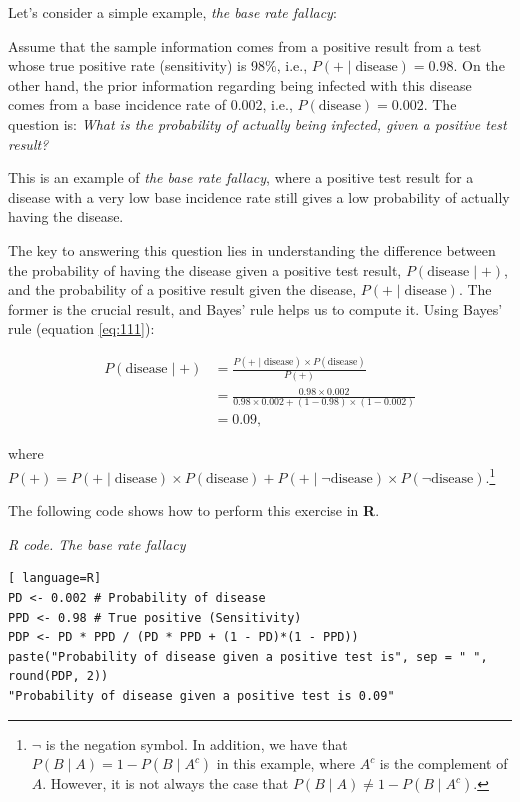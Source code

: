 Let's consider a simple example, \textit{the base rate fallacy}:

Assume that the sample information comes from a positive result from a test whose true positive rate (sensitivity) is 98\%, i.e., \( P(+ \mid \text{disease}) = 0.98 \). On the other hand, the prior information regarding being infected with this disease comes from a base incidence rate of 0.002, i.e., \( P(\text{disease}) = 0.002 \). The question is: \textit{What is the probability of actually being infected, given a positive test result?}

This is an example of \textit{the base rate fallacy}, where a positive test result for a disease with a very low base incidence rate still gives a low probability of actually having the disease.

The key to answering this question lies in understanding the difference between the probability of having the disease given a positive test result, \( P(\text{disease} \mid +) \), and the probability of a positive result given the disease, \( P(+ \mid \text{disease}) \). The former is the crucial result, and Bayes' rule helps us to compute it. Using Bayes' rule (equation \ref{eq:111}):

\begin{align*}
	P(\text{disease}\mid +) & = \frac{P(+\mid \text{disease})\times P(\text{disease})}{P(+)}\\
	& = \frac{0.98 \times 0.002}{0.98 \times 0.002 + (1-0.98) \times (1-0.002)}\\
	& =0.09, 
\end{align*}

where $P(+)=P(+\mid \text{disease})\times P(\text{disease})+P(+\mid \lnot\text{disease})\times P( \lnot\text{disease})$.\footnote{$\lnot$ is the negation symbol. In addition, we have that $P(B\mid A)=1-P(B\mid A^c)$ in this example, where $A^c$ is the complement of $A$. However, it is not always the case that $P(B\mid A)\neq 1-P(B\mid A^c)$.}

The following code shows how to perform this exercise in \textbf{R}.

\begin{tcolorbox}[enhanced,width=4.67in,center upper,
	fontupper=\large\bfseries,drop shadow southwest,sharp corners]
\textit{R code. The base rate fallacy}
\begin{VF}
\begin{lstlisting}[ language=R]
PD <- 0.002 # Probability of disease
PPD <- 0.98 # True positive (Sensitivity)
PDP <- PD * PPD / (PD * PPD + (1 - PD)*(1 - PPD))
paste("Probability of disease given a positive test is", sep = " ", round(PDP, 2))
"Probability of disease given a positive test is 0.09"
\end{lstlisting}
\end{VF}
\end{tcolorbox}

